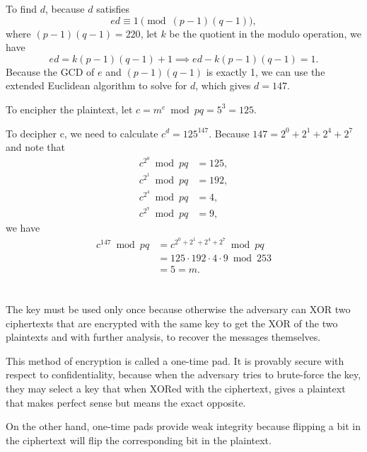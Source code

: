 \documentclass{article}
\begin{document}
To find $d$, because $d$ satisfies
\[
    ed \equiv 1 \pmod{(p - 1)(q - 1)},
\]
where $(p - 1)(q - 1) = 220$, let $k$ be the quotient in the modulo operation, we have
\[
ed = k(p - 1)(q - 1) + 1 \implies ed - k(p - 1)(q - 1) = 1.
\]
Because the GCD of $e$ and $(p - 1)(q - 1)$ is exactly 1, we can use the extended Euclidean algorithm to solve for $d$, which gives $d = 147$.

To encipher the plaintext, let $c = m^e \bmod pq = 5^3 = 125$.

To decipher c, we need to calculate $c^d = 125^{147}$. Because $147 = 2^0 + 2^1 + 2^4 + 2^7$ and note that
\begin{align*}
    c^{2^0} \bmod pq &= 125,\\
    c^{2^1} \bmod pq &= 192,\\
    c^{2^4} \bmod pq &= 4,\\
    c^{2^7} \bmod pq &= 9,
\end{align*}
we have
\begin{align*}
    c^{147} \bmod pq &= c^{2^0 + 2^1 + 2^4 + 2^7} \bmod pq\\
        &= 125 \cdot 192 \cdot 4 \cdot 9 \bmod 253\\
        &= 5 = m.
\end{align*}

\section{}

The key must be used only once because otherwise the adversary can XOR two ciphertexts that are encrypted with the same key to get the XOR of the two plaintexts and with further analysis, to recover the messages themselves.

This method of encryption is called a one-time pad. It is provably secure with respect to confidentiality, because when the adversary tries to brute-force the key, they may select a key that when XORed with the ciphertext, gives a plaintext that makes perfect sense but means the exact opposite.

On the other hand, one-time pads provide weak integrity because flipping a bit in the ciphertext will flip the corresponding bit in the plaintext.
\end{document}
